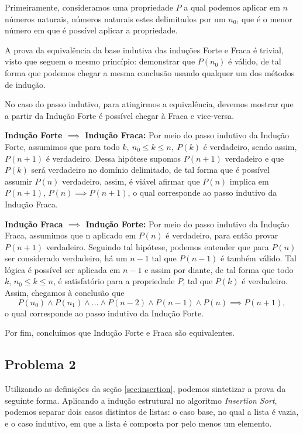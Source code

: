 \documentclass[a4paper, 10pt]{article}
\begin{document}
Primeiramente, consideramos uma propriedade $P$ a qual podemos aplicar em $n$ números naturais, números naturais estes delimitados por um $n_0$, que é o menor número em que é possível aplicar a propriedade.

A prova da equivalência da base indutiva das induções Forte e Fraca é trivial, visto que seguem o mesmo princípio: demonstrar que $P(n_0)$ é válido, de tal forma que podemos chegar a mesma conclusão usando qualquer um dos métodos de indução.

No caso do passo indutivo, para atingirmos a equivalência, devemos mostrar que a partir da Indução Forte é possível chegar à Fraca e vice-versa.

\textbf{Indução Forte $\implies$ Indução Fraca:}
	Por meio do passo indutivo da Indução Forte, assumimos que para todo $k,\:n_0 \leq k \leq n,\:P(k)$ é verdadeiro, sendo assim, $P(n+1)$ é verdadeiro.
	Dessa hipótese supomos $P(n+1)$ verdadeiro e que $P(k)$ será verdadeiro no domínio delimitado, de tal forma que é possível assumir $P(n)$ verdadeiro, assim, é viável afirmar que $P(n)$ implica em $P(n+1)$, $P(n) \implies P(n+1)$, o qual corresponde ao passo indutivo da Indução Fraca.
	
\textbf{Indução Fraca $\implies$ Indução Forte:}
	Por meio do passo indutivo da Indução Fraca, assumimos que n aplicado em $P(n)$ é verdadeiro, para então provar $P(n+1)$ verdadeiro.
	Seguindo tal hipótese, podemos entender que para $P(n)$ ser considerado verdadeiro, há um $n-1$ tal que $P(n-1)$ é também válido. Tal lógica é possível ser aplicada em $n-1$ e assim por diante, de tal forma que todo $k$, $n_0 \leq k \leq n$, é satisfatório para a propriedade $P$, tal que $P(k)$ é verdadeiro.
	Assim, chegamos à conclusão que 
\begin{equation*}
  P(n_0) \wedge P(n_1) \wedge ... \wedge P(n-2) \wedge P(n-1) \wedge P(n) \implies P(n+1),
\end{equation*}    
    o qual corresponde ao passo indutivo da Indução Forte.

Por fim, concluímos que Indução Forte e Fraca são equivalentes.

\subsection{Problema 2}

Utilizando as definições da seção \ref{sec:insertion}, podemos sintetizar a prova da seguinte forma.
Aplicando a indução estrutural no algoritmo \textit{Insertion Sort}, podemos separar dois casos distintos de listas: o caso base, no qual a lista é vazia, e o caso indutivo, em que a lista é composta por pelo menos um elemento.
\end{document}
